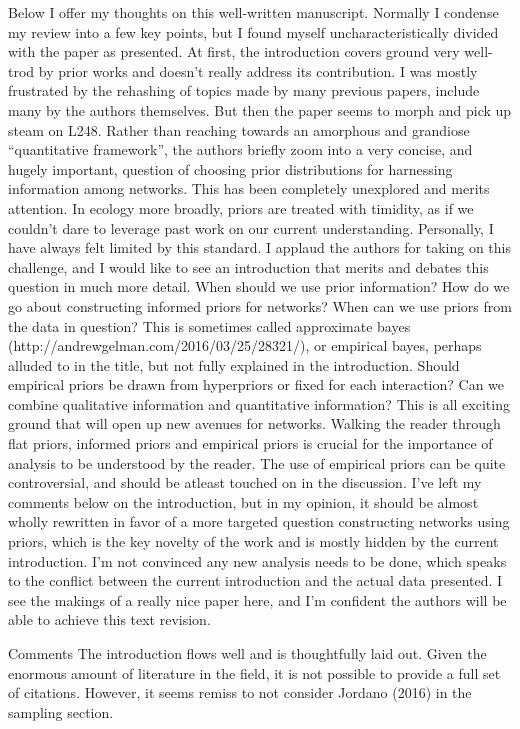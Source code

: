 \documentclass[12pt]{letter}
\begin{document}
	Below I offer my thoughts on this well-written manuscript. Normally I condense my review into a few key points, but I found myself uncharacteristically divided with the paper as presented. At first, the introduction covers ground very well-trod by prior works and doesn’t really address its contribution. I was mostly frustrated by the rehashing of topics made by many previous papers, include many by the authors themselves. But then the paper seems to morph and pick up steam on L248. Rather than reaching towards an amorphous and grandiose “quantitative framework”, the authors briefly zoom into a very concise, and hugely important, question of choosing prior distributions for harnessing information among networks. This has been completely unexplored and merits attention. In ecology more broadly, priors are treated with timidity, as if we couldn’t dare to leverage past work on our current understanding. Personally, I have always felt limited by this standard. I applaud the authors for taking on this challenge, and I would like to see an introduction that merits and debates this question in much more detail. When should we use prior information? How do we go about constructing informed priors for networks? When can we use priors from the data in question? This is sometimes called approximate bayes (http://andrewgelman.com/2016/03/25/28321/), or empirical bayes, perhaps alluded to in the title, but not fully explained in the introduction. Should empirical priors be drawn from hyperpriors or fixed for each interaction? Can we combine qualitative information and quantitative information? This is all exciting ground that will open up new avenues for networks. Walking the reader through flat priors, informed priors and empirical priors is crucial for the importance of analysis to be understood by the reader. The use of empirical priors can be quite controversial, and should be atleast touched on in the discussion.
	I’ve left my comments below on the introduction, but in my opinion, it should be almost wholly rewritten in favor of a more targeted question constructing networks using priors, which is the key novelty of the work and is mostly hidden by the current introduction. I’m not convinced any new analysis needs to be done, which speaks to the conflict between the current introduction and the actual data presented. I see the makings of a really nice paper here, and I’m confident the authors will be able to achieve this text revision.

	Comments
	The introduction flows well and is thoughtfully laid out. Given the enormous amount of literature in the field, it is not possible to provide a full set of citations. However, it seems remiss to not consider Jordano (2016) in the sampling section.
\end{document}
